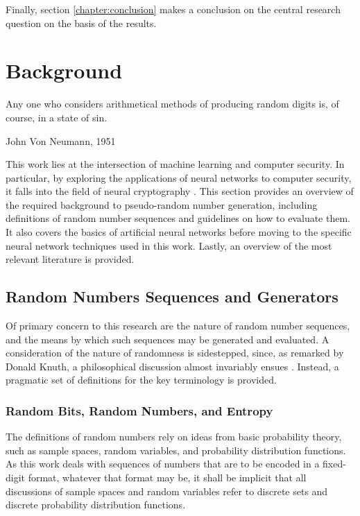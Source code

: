 \documentclass[12pt, titlepage]{report}
\theoremstyle{definition}
\begin{document}
Finally, section \ref{chapter:conclusion} makes a conclusion on the central research question on the basis of the results.




\chapter{Background}\label{chapter:background}
\epigraph{Any one who considers arithmetical methods of producing random digits is, of course, in a state of sin.}{John Von Neumann, 1951}

This work lies at the intersection of machine learning and computer security. In particular, by exploring the applications of neural networks to computer security, it falls into the field of neural cryptography \cite{klimov2002analysis}. This section provides an overview of the required background to pseudo-random number generation, including definitions of random number sequences and guidelines on how to evaluate them. It also covers the basics of artificial neural networks before moving to the specific neural network techniques used in this work. Lastly, an overview of the most relevant literature is provided.

\section{Random Numbers Sequences and Generators}
Of primary concern to this research are the nature of random number sequences, and the means by which such sequences may be generated and evaluated. A consideration of the nature of randomness is sidestepped, since, as remarked by Donald Knuth, a philosophical discussion almost invariably ensues \cite[p. 2]{donald1998art}. Instead, a pragmatic set of definitions for the key terminology is provided.

\subsection{Random Bits, Random Numbers, and Entropy}
The definitions of random numbers rely on ideas from basic probability theory, such as sample spaces, random variables, and probability distribution functions. As this work deals with sequences of numbers that are to be encoded in a fixed-digit format, whatever that format may be, it shall be implicit that all discussions of sample spaces and random variables refer to discrete sets and discrete probability distribution functions.
\end{document}
